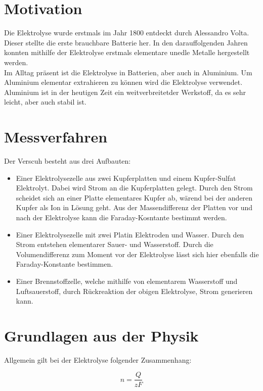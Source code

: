 \section{Motivation}

Die Elektrolyse wurde erstmals im Jahr 1800 entdeckt durch Alessandro Volta. Dieser stellte die erste brauchbare Batterie her.
In den darauffolgenden Jahren konnten mithilfe der Elektrolyse erstmals elementare unedle Metalle hergestellt werden. \\
Im Alltag präsent ist die Elektrolyse in Batterien, aber auch in Aluminium.
Um Aluminium elementar extrahieren zu können wird die Elektrolyse verwendet. Aluminium ist in der heutigen Zeit ein weitverbreitetder
Werkstoff, da es sehr leicht, aber auch stabil ist.

\section{Messverfahren}
Der Verscuh besteht aus drei Aufbauten:\\
\begin{itemize}
    \item Einer Elektrolysezelle aus zwei Kupferplatten und einem Kupfer-Sulfat Elektrolyt. Dabei wird Strom an die Kupferplatten gelegt. Durch den Strom
    scheidet sich an einer Platte elementares Kupfer ab, wärend bei der anderen Kupfer als Ion in Lösung geht. Aus der Massendifferenz der Platten vor und nach der Elektrolyse kann die Faraday-Kosntante bestimmt werden.
    \item Einer Elektrolysezelle mit zwei Platin Elektroden und Wasser. Durch den Strom entstehen elementarer Sauer- und Wasserstoff. Durch die Volumendifferenz zum Moment vor der Elektrolyse
    lässt sich hier ebenfalls die Faraday-Konstante bestimmen.
    \item Einer Brennstoffzelle, welche mithilfe von elementarem Wasserstoff und Luftsauerstoff, durch Rückreaktion der obigen Elektrolyse, Strom generieren kann.
\end{itemize}



\section{Grundlagen aus der Physik}
Allgemein gilt bei der Elektrolyse folgender Zusammenhang:

\begin{equation}
    n = \frac{Q}{zF}
    \label{eq:eF}
\end{equation}



